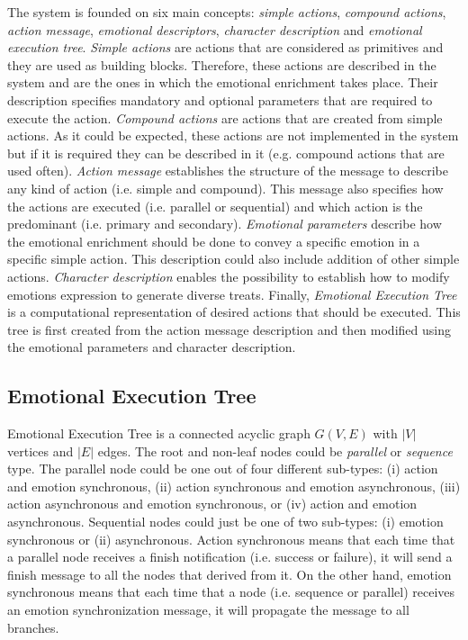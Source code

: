 \documentclass{sig-alternate-05-2015}
\begin{document}
The system is founded on six main concepts: \textit{simple actions}, \textit{compound actions}, \textit{action message}, \textit{emotional descriptors}, \textit{character description} and \textit{emotional execution tree}.  \textit{Simple actions} are actions that are considered as primitives and they are used as building blocks. Therefore, these actions are described in the system and are the ones in which the emotional enrichment takes place. Their description specifies mandatory and optional parameters that are required to execute the action. \textit{Compound actions} are actions that are created from simple actions. As it could be expected, these actions are not implemented in the system but if it is required they can be described in it (e.g. compound actions that are used often). \textit{Action message} establishes the structure of the message to describe any kind of action (i.e. simple and compound). This message also specifies how the actions are executed (i.e. parallel or sequential) and which action is the predominant (i.e. primary and secondary). \textit{Emotional parameters} describe how the emotional enrichment should be done to convey a specific emotion in a specific simple action. This description could also include addition of other simple actions. \textit{Character description} enables the possibility to establish how to modify emotions expression to generate diverse treats. Finally, \textit{Emotional Execution Tree} is a computational representation of desired actions that should be executed. This tree is first created from the action message description and then modified using the emotional parameters and character description.   

\subsection{Emotional Execution Tree}

Emotional Execution Tree is a connected acyclic graph $G(V,E)$ with $|V|$ vertices and $|E|$ edges. The root and non-leaf nodes could be \textit{parallel} or \textit{sequence} type. The parallel node could be one out of four different sub-types: (i) action and emotion synchronous, (ii) action synchronous and emotion asynchronous, (iii) action asynchronous and emotion synchronous, or (iv) action and emotion asynchronous. Sequential nodes could just be one of two sub-types: (i) emotion synchronous or (ii) asynchronous. Action synchronous means that each time that a parallel node receives a finish notification (i.e. success or failure), it will send a finish message to all the nodes that derived from it. On the other hand, emotion synchronous means that each time that a node (i.e. sequence or parallel) receives an emotion synchronization message, it will propagate the message to all branches.
 
\end{document}
